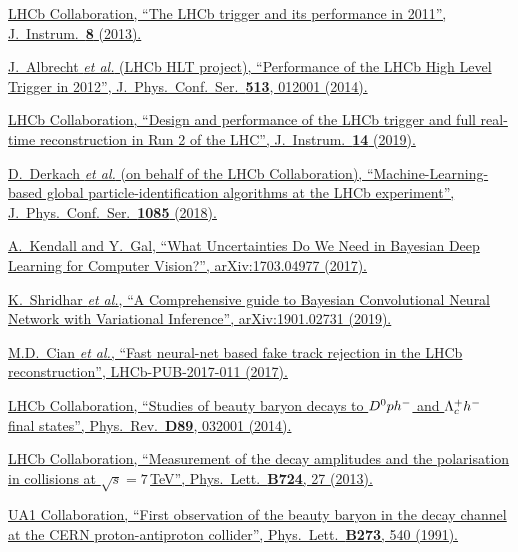 {\begin{thebibliography}{xxx}
	\href{https://doi.org/10.1088/1748-0221/8/04/p04022}{LHCb Collaboration, \enquote{The LHCb trigger and its performance in 2011}, J.\ Instrum.\ \textbf{8} (2013).}

	\href{https://doi.org/10.1088/1742-6596/513/1/012001}{J.~Albrecht \textit{et al.} (LHCb HLT project), \enquote{Performance of the LHCb High Level Trigger in 2012}, J.\ Phys.\ Conf.\ Ser.\ \textbf{513}, 012001 (2014).}

	\href{https://doi.org/10.1088/1748-0221/14/04/P04013}{LHCb Collaboration, \enquote{Design and performance of the LHCb trigger and full real-time reconstruction in Run 2 of the LHC}, J.\ Instrum.\ \textbf{14} (2019).}

	\href{https://doi.org/10.1088/1742-6596/1085/4/042038}{D.~Derkach \textit{et al.} (on behalf of the LHCb Collaboration), \enquote{Machine-Learning-based global particle-identification algorithms at the LHCb experiment}, J.\ Phys.\ Conf.\ Ser.\ \textbf{1085} (2018).}

	\href{https://arxiv.org/abs/1703.04977}{A.~Kendall and Y.~Gal, \enquote{What Uncertainties Do We Need in Bayesian Deep Learning for Computer Vision?}, arXiv:1703.04977 (2017).}

	\href{https://arxiv.org/abs/1901.02731}{K.~Shridhar \textit{et al.}, \enquote{A Comprehensive guide to Bayesian Convolutional Neural Network with Variational Inference}, arXiv:1901.02731 (2019).}

	\href{https://cds.cern.ch/record/2255039/files/LHCb-PUB-2017-011.pdf}{M.D.~Cian \textit{et al.}, \enquote{Fast neural-net based fake track rejection in the LHCb reconstruction}, LHCb-PUB-2017-011 (2017).}

	\href{https://doi.org/10.1103/PhysRevD.89.032001}{LHCb Collaboration, \enquote{Studies of beauty baryon decays to ${{D}^0}{p}h^-$ and ${\Lambda}^+_{c}h^-$ final states}, Phys.\ Rev.\ \textbf{D89}, 032001 (2014).}

	\href{https://doi.org/10.1016/j.physletb.2013.05.041}{LHCb Collaboration, \enquote{Measurement of the \decay{\Lb}{\jpsi\Lz} decay amplitudes and the \Lb polarisation in \proton\proton collisions at $\sqrt{s} = 7\,$TeV}, Phys.\ Lett.\ \textbf{B724}, 27 (2013).}

	\href{https://doi.org/10.1016/0370-2693(91)90311-D}{UA1 Collaboration, \enquote{First observation of the beauty baryon \Lb in the decay channel \decay{\Lb}{\jpsi\Lz} at the CERN proton-antiproton collider}, Phys.\ Lett.\ \textbf{B273}, 540 (1991).}


\end{thebibliography}}

